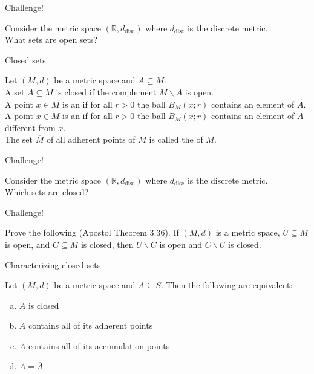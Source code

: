 \documentclass{beamer}
\begin{document}
\begin{frame}{Challenge!}
\begin{prob}
Consider the metric space $(\mathbb{R},d_{\text{disc}})$ where $d_{\text{disc}}$ is the discrete metric.\\
What sets are open sets?
\end{prob}
\end{frame}

\begin{frame}{Closed sets}
\begin{defn}
\pause
Let $(M,d)$ be a metric space and $A\subseteq M$.\\
\pause
A set $A\subseteq M$ is closed if the complement $M\backslash A$ is open.\\
\pause
A point $ x\in M$ is an  if for all $r>0$ the ball $B_M( x; r)$ contains an element of $A$.\\
\pause
A point $ x\in M$ is an  if for all $r>0$ the ball $B_M( x; r)$ contains an element of $A$ different from $x$.\\
\pause
The set $\overline M$ of all adherent points of $M$ is called the  of $M$.
\end{defn}
\end{frame}


\begin{frame}{Challenge!}
\begin{prob}
Consider the metric space $(\mathbb{R},d_{\text{disc}})$ where $d_{\text{disc}}$ is the discrete metric.\\
Which sets are closed?
\end{prob}
\end{frame}

\begin{frame}{Challenge!}
\begin{prob}
Prove the following (Apostol Theorem 3.36).
If $(M,d)$ is a metric space, $U\subseteq M$ is open, and $C\subseteq M$ is closed, then $U\backslash C$ is open and $C\backslash U$ is closed.
\end{prob}
\end{frame}

\begin{frame}{Characterizing closed sets}
\begin{thm}
Let $(M,d)$ be a metric space and $A\subseteq S$.  Then the following are equivalent:
\begin{enumerate}[(a)]
\pause
\item $A$ is closed
\pause
\item $A$ contains all of its adherent points
\pause
\item $A$ contains all of its accumulation points
\pause
\item $A=\overline{A}$
\end{enumerate}
\end{thm}
\end{frame}
\end{document}
